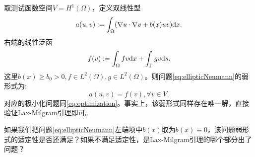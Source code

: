 取测试函数空间$V=H^{1}(\Omega)$，定义双线性型
\begin{equation}
  a(u,v):=\int_{\Omega}(\nabla u\cdot\nabla v+b(x)uv)\mathrm{d} x.
\end{equation}
右端的线性泛函
\begin{equation}
  f(v):=\int_{\Omega}fv\mathrm{d} x+\int_{\Gamma}gv\mathrm{d} s.
\end{equation}
这里$b(x)\ge b_{0}>0,f\in L^{2}(\Omega),g\in L^{2}(\Omega)$。则问题\eqref{eq:ellipticNeumann}的弱形式为:
\begin{equation}
  a(u,v)=f(v),\forall v\in V.
\end{equation}
对应的极小化问题同\eqref{eq:optimization}。事实上，该弱形式同样存在唯一解，直接验证Lax-Milgram引理即可。
\begin{exercise}
  如果我们把问题\eqref{eq:ellipticNeumann}左端项中$b(x)$取为$b(x)\equiv 0$，该问题弱形式的适定性是否还满足？如果不满足适定性，是Lax-Milgram引理的哪个部分出了问题？
\end{exercise}
